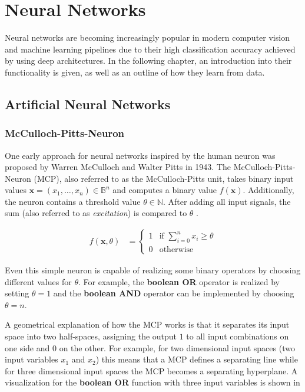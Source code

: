 \section{Neural Networks}
\label{sec:neural_networks}
Neural networks are becoming increasingly popular in modern computer vision and machine learning pipelines due to their high classification accuracy achieved by using deep architectures.
In the following chapter, an introduction into their functionality is given, as well as an outline of how they learn from data.

\subsection{Artificial Neural Networks}

\subsubsection{McCulloch-Pitts-Neuron}
One early approach for neural networks inspired by the human neuron was proposed by Warren McCulloch and Walter Pitts in 1943.
The McCulloch-Pitts-Neuron (MCP), also referred to as the McCulloch-Pitts unit, takes binary input values $\bm{x} = (x_1, \dots, x_n) \in \mathbb{B}^n$ and computes a binary value $f(\bm{x})$.
Additionally, the neuron contains a threshold value $\theta \in \mathbb{N}$.
After adding all input signals, the sum (also referred to as \textit{excitation}) is compared to $\theta$ .

\begin{equation}
    \begin{split}
        \label{eq:mcculloch-binary}
        f(\bm{x}, \theta)
        &=
        \begin{cases}
            1 & \text{if } \sum_{i=0}^n x_i \geq \theta \\
            0 & \text{otherwise}
        \end{cases}
    \end{split}
\end{equation}

Even this simple neuron is capable of realizing some binary operators by choosing different values for $\theta$.
For example, the \textbf{boolean OR} operator is realized by setting $\theta = 1$ and the \textbf{boolean AND} operator can be implemented by choosing $\theta = n$.

A geometrical explanation of how the MCP works is that it separates its input space into two half-spaces, assigning the output $1$ to all input combinations on one side and $0$ on the other.
For example, for two dimensional input spaces (two input variables $x_1$ and $x_2$) this means that a MCP defines a separating line while for three dimensional input spaces the MCP becomes a separating hyperplane.
A visualization for the \textbf{boolean OR} function with three input variables is shown in 

